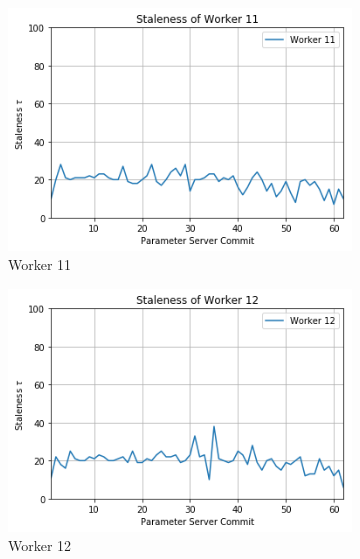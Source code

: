 \begin{figure}
\begin{subfigure}{.24\textwidth}
    \includegraphics[width=\linewidth]{resources/images/plots/adag_agn_mnist/epoch_40/15/001/staleness/worker_11}
    \caption{Worker 11}
  \end{subfigure}
  \begin{subfigure}{.24\textwidth}
    \centering
    \includegraphics[width=\linewidth]{resources/images/plots/adag_agn_mnist/epoch_40/15/001/staleness/worker_12}
    \caption{Worker 12}
  \end{subfigure}
  \begin{subfigure}{.24\textwidth}
    \centering

\end{subfigure}
\end{figure}
